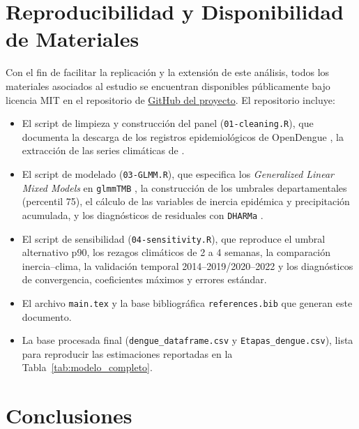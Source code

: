 \documentclass[11pt,a4paper]{article}
\begin{document}
\section{Reproducibilidad y Disponibilidad de Materiales}

Con el fin de facilitar la replicación y la extensión de este análisis, todos los materiales asociados al estudio se encuentran disponibles públicamente bajo licencia MIT en el repositorio de \href{https://github.com/Emerson-nic/Dengue-Nicaragua-Model/tree/main}{GitHub del proyecto}. El repositorio incluye:

\begin{itemize}
	\item El script de limpieza y construcción del panel (\texttt{01-cleaning.R}), que documenta la descarga de los registros epidemiológicos de OpenDengue \parencite{clarke2025opendengue}, la extracción de las series climáticas de \textcite{openmeteo_historical}.
	\item El script de modelado (\texttt{03-GLMM.R}), que especifica los \textit{Generalized Linear Mixed Models} en \texttt{glmmTMB} \parencite{brooks2017glmmtmb}, la construcción de los umbrales departamentales (percentil 75), el cálculo de las variables de inercia epidémica y precipitación acumulada, y los diagnósticos de residuales con \texttt{DHARMa} \parencite{hartig2022dharma}.
	\item El script de sensibilidad (\texttt{04-sensitivity.R}), que reproduce el umbral alternativo p90, los rezagos climáticos de 2 a 4 semanas, la comparación inercia--clima, la validación temporal 2014--2019/2020--2022 y los diagnósticos de convergencia, coeficientes máximos y errores estándar.
	\item El archivo \texttt{main.tex} y la base bibliográfica \texttt{references.bib} que generan este documento.
	\item La base procesada final (\texttt{dengue\_dataframe.csv} y \texttt{Etapas\_dengue.csv}), lista para reproducir las estimaciones reportadas en la Tabla~\ref{tab:modelo_completo}.
\end{itemize}

\section{Conclusiones}
\end{document}
